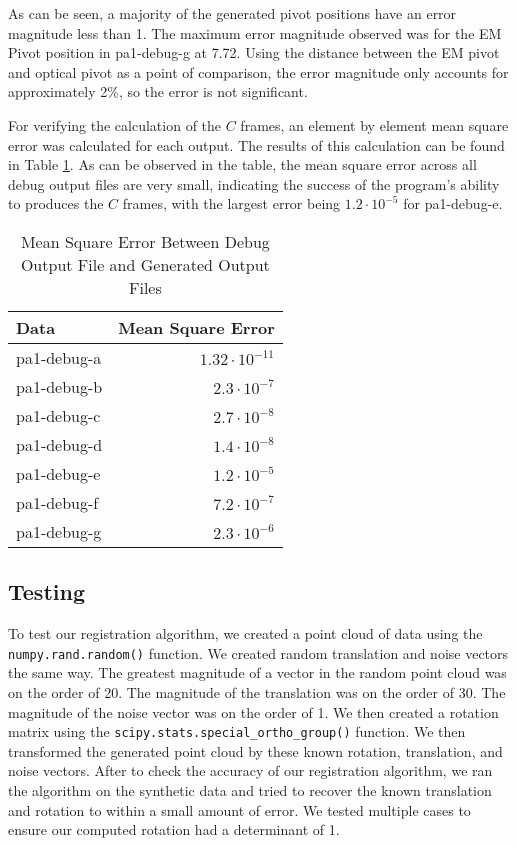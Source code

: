 \documentclass[12pt,letterpaper]{scrartcl}
\begin{document}
    As can be seen, a majority of the generated pivot positions have an error magnitude less than 1. 
    The maximum error magnitude observed was for the EM Pivot position in pa1-debug-g at 7.72.
    Using the distance between the EM pivot and optical pivot as a point of comparison, the error magnitude only accounts for approximately 2\%, so the error is not significant. 
    
    For verifying the calculation of the $C$ frames, an element by element mean square error was calculated for each output.
    The results of this calculation can be found in Table \ref{tab:c}.
    As can be observed in the table, the mean square error across all debug output files are very small, indicating the success of the program's ability to produces the $C$ frames, with the largest error being $1.2 \cdot 10^{-5}$ for pa1-debug-e.
\begin{table}[]
\centering
\caption{Mean Square Error Between Debug Output File and Generated Output Files}
\label{tab:c}
\begin{tabular}{@{}lr@{}}
\toprule
\textbf{Data} & \textbf{Mean Square Error} \\ \midrule
pa1-debug-a   & $1.32 \cdot 10^{-11}$            \\
pa1-debug-b   & $2.3 \cdot 10^{-7}$               \\
pa1-debug-c   & $2.7\cdot 10^{-8}$             \\
pa1-debug-d   & $1.4\cdot 10^{-8}$               \\
pa1-debug-e   & $1.2\cdot 10^{-5}$               \\
pa1-debug-f   & $7.2 \cdot 10^{-7}$               \\
pa1-debug-g   & $2.3 \cdot 10^{-6}$              \\ \bottomrule
\end{tabular}%
\end{table}
    \subsection{Testing}
    To test our registration algorithm, we created a point cloud of data using the \texttt{numpy.rand.random()} function. We created random translation and noise vectors the same way. The greatest magnitude of a vector in the random point cloud was on the order of 20. The magnitude of the translation was on the order of 30. The magnitude of the noise vector was on the order of 1. We then created a rotation matrix using the \texttt{scipy.stats.special\_ortho\_group()} function. We then transformed the generated point cloud by these known rotation, translation, and noise vectors. After to check the accuracy of our registration algorithm, we ran the algorithm on the synthetic data and tried to recover the known translation and rotation to within a small amount of error. We tested multiple cases to ensure our computed rotation had a determinant of 1.
        
\end{document}
